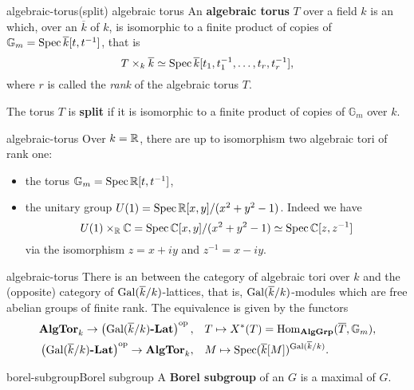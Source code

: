 \begin{topic}{algebraic-torus}{(split) algebraic torus}
    An \textbf{algebraic torus} $T$ over a field $k$ is an  which, over an  $\overline{k}$ of $k$, is isomorphic to a finite product of copies of $\mathbb{G}_m = \operatorname{Spec} \overline{k}[t, t^{-1}]$, that is
    \[ T \times_k \overline{k} \simeq \operatorname{Spec} \overline{k}[t_1, t_1^{-1}, \ldots, t_r, t_r^{-1}] , \]
    where $r$ is called the \textit{rank} of the algebraic torus $T$.
    
    The torus $T$ is \textbf{split} if it is isomorphic to a finite product of copies of $\mathbb{G}_m$ over $k$.
\end{topic}

\begin{example}{algebraic-torus}
    Over $k = \mathbb{R}$, there are up to isomorphism two algebraic tori of rank one:
    \begin{itemize}
        \item the torus $\mathbb{G}_m = \operatorname{Spec} \mathbb{R}[t, t^{-1}]$,
        \item the unitary group $U(1) = \operatorname{Spec} \mathbb{R}[x, y] / (x^2 + y^2 - 1)$. Indeed we have
        \[ U(1) \times_{\mathbb{R}} \mathbb{C} = \operatorname{Spec} \mathbb{C}[x, y] / (x^2 + y^2 - 1) \simeq \operatorname{Spec} \mathbb{C}[z, z^{-1}] \]
        via the isomorphism $z = x + iy$ and $z^{-1} = x - iy$.
    \end{itemize}
\end{example}

\begin{example}{algebraic-torus}
    There is an  between the category of algebraic tori over $k$ and the (opposite) category of $\textup{Gal}(\overline{k}/k)$-lattices, that is, $\textup{Gal}(\overline{k}/k)$-modules which are free abelian groups of finite rank. The equivalence is given by the functors
    \[ \begin{aligned}
        \textbf{AlgTor}_k \to \left(\textup{Gal}(\overline{k}/k)\textbf{-Lat}\right)^\textup{op}, & \quad T \mapsto X^*(T) = \text{Hom}_{\textbf{AlgGrp}}(\overline{T}, \mathbb{G}_m) , \\
        \left(\textup{Gal}(\overline{k}/k)\textbf{-Lat}\right)^\textup{op} \to \textbf{AlgTor}_k, & \quad M \mapsto \operatorname{Spec}(\overline{k}[M])^{\textup{Gal}(\overline{k}/k)} .
    \end{aligned} \]
\end{example}

\begin{topic}{borel-subgroup}{Borel subgroup}
    A \textbf{Borel subgroup} of an  $G$ is a maximal    of $G$.
\end{topic}

